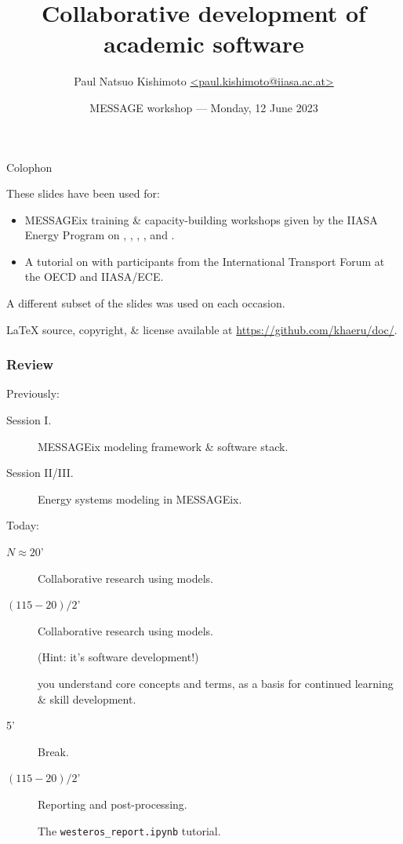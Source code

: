 \documentclass[12pt,aspectratio=169]{beamer}
\title{Collaborative development of academic software}
\institute{IIASA Energy, Climate, and Environment program}
\date{MESSAGE workshop — Monday, 12 June 2023}
\author{\texorpdfstring{Paul Natsuo Kishimoto \scriptsize\newline
  \href{mailto:paul.kishimoto@iiasa.ac.at}%
       {\ttfamily <paul.kishimoto@iiasa.ac.at>}}%
  {Paul Natsuo Kishimoto <paul.kishimoto@iiasa.ac.at>}}
\begin{document}
\maketitle

\begin{frame}{Colophon}

  These slides have been used for:
  \begin{itemize}
    \item MESSAGEix training \& capacity-building workshops given by the IIASA Energy Program on , , , , and .

    \item A tutorial on  with participants from the International Transport Forum at the OECD and IIASA/ECE.
  \end{itemize}

  \medskip
  A different subset of the slides was used on each occasion.

  \medskip
  LaTeX source, copyright, \& license available at \url{https://github.com/khaeru/doc/}.

\end{frame}

\begin{frame}  %
  \frametitle{Review}

  Previously:
  \begin{description}
    \item [Session I.] MESSAGEix modeling framework \& software stack.
    \item [Session II/III.] Energy systems modeling in MESSAGEix.
  \end{description}

  \bigskip
  Today:
  \begin{description}
    \item [$N \approx 20$'] Collaborative research using models.


    \item [$(115 - 20) / 2$'] Collaborative research using models.

          (Hint: it's software development!)

           you understand core concepts and terms, as a basis for continued learning \& skill development.

    \item [5'] Break.

    \item [$(115 - 20) / 2$'] Reporting and post-processing.

          The \texttt{westeros\_report.ipynb} tutorial.
  \end{description}

\end{frame}
\end{document}

